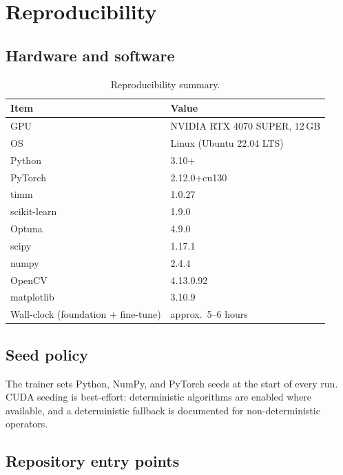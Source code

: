 \documentclass[../preamble.tex]{subfiles}
\begin{document}
\chapter{Reproducibility}
\label{app:reproducibility}

\section{Hardware and software}
\label{app:repro-hw-sw}

\begin{table}[htbp]
  \centering
  \small
  \caption{Reproducibility summary.}
  \label{tab:repro-summary}
  \begin{tabular}{ll}
    \toprule
    \textbf{Item} & \textbf{Value} \\
    \midrule
    GPU            & NVIDIA RTX 4070 SUPER, 12\,GB \\
    OS             & Linux (Ubuntu 22.04 LTS) \\
    Python         & 3.10+ \\
    PyTorch        & 2.12.0+cu130 \\
    timm           & 1.0.27 \\
    scikit-learn   & 1.9.0 \\
    Optuna         & 4.9.0 \\
    scipy          & 1.17.1 \\
    numpy          & 2.4.4 \\
    OpenCV         & 4.13.0.92 \\
    matplotlib     & 3.10.9 \\
    Wall-clock (foundation + fine-tune) & approx.\ 5--6 hours \\
    \bottomrule
  \end{tabular}
\end{table}

\section{Seed policy}
\label{app:repro-seed}

The trainer sets Python, NumPy, and PyTorch seeds at the start of every
run. CUDA seeding is best-effort: deterministic algorithms are enabled
where available, and a deterministic fallback is documented for non-deterministic
operators.

\section{Repository entry points}
\label{app:repro-repo}
\end{document}
